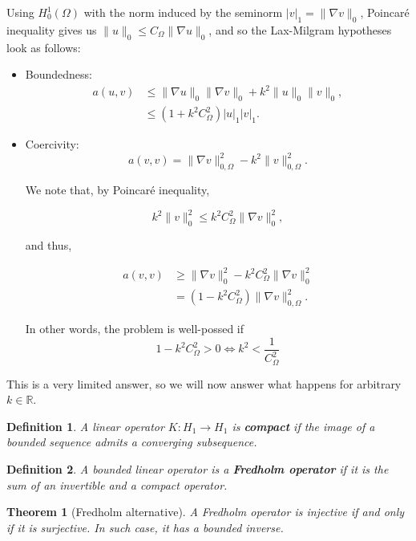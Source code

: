 \documentclass{article}
\newtheorem{definition}{Definition}
\newcommand{\R}{\mathbb{R}}
\newtheorem{theorem}{Theorem}
\begin{document}
Using $H_0^1(\Omega)$ with the norm induced by the seminorm $|v|_1 = \|\nabla v\|_0$, Poincaré inequality gives us $\|u\|_0\leq C_{\Omega}\|\nabla u\|_0$, and so the Lax-Milgram hypotheses look as follows: 

\begin{itemize}
    \item Boundedness: 
    \begin{align*}
        a(u,v) &\leq \|\nabla u\|_0\|\nabla v\|_0 + k^2\|u\|_0\|v\|_0,\\ 
        &\leq (1+k^2C_\Omega^2)|u|_1|v|_1.
    \end{align*}

    \item Coercivity: 
    \begin{equation*}
        a(v,v) = \|\nabla v\|^2_{0,\Omega} - k^2\|v\|^2_{0,\Omega}.
    \end{equation*}

    We note that, by Poincaré inequality,

    \[ k^2\|v\|^2_0 \leq k^2 C^2_{\Omega}\|\nabla v\|^2_0, \]

    and thus,

    \begin{align*}
        a(v,v) &\geq \|\nabla v\|^2_0 - k^2C_\Omega^2\|\nabla v\|^2_0 \\
        &= (1- k^2 C_\Omega^2)\|\nabla v\|^2_{0,\Omega}.
    \end{align*}

    In other words, the problem is well-possed if 
    $$1-k^2C_\Omega^2 > 0 \iff k^2 < \frac{1}{C_\Omega^2}$$
\end{itemize}

This is a very limited answer, so we will now answer what happens for arbitrary $k\in\R$.

\begin{definition}
    A linear operator $K:H_1 \to H_1$ is \textbf{compact} if the image of a bounded sequence admits a converging subsequence.
\end{definition}
\begin{definition}
    A bounded linear operator is a \textbf{Fredholm operator} if it is the sum of an invertible and a compact operator. 
\end{definition}

\begin{theorem}[Fredholm alternative]
    A Fredholm operator is injective if and only if it is surjective. In such case, it has a bounded inverse.
\end{theorem}
\end{document}
